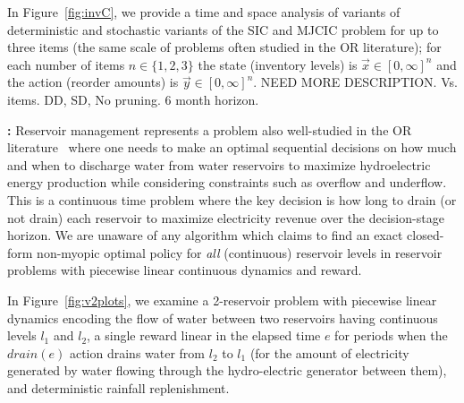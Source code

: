 In Figure~\ref{fig:invC}, we provide a time and space analysis
of variants of deterministic and stochastic variants of the
SIC and MJCIC problem for up to three items (the same scale of
problems often studied in the OR literature); for each number
of items $n \in \{ 1,2,3 \}$ the state (inventory levels) 
is $\vec{x} \in [0,\infty]^n$ and the 
action (reorder amounts) is $\vec{y} \in [0,\infty]^n$.
NEED MORE DESCRIPTION.  Vs. items.  DD, SD, No pruning.  6 month horizon.


{\bf \WaterReservoir:} Reservoir management represents a problem also
well-studied in the OR literature~\cite{Mahootchi2009,Yeh1985} where
one needs to make an optimal sequential decisions on how much and when
to discharge water from water reservoirs to maximize hydroelectric
energy production while considering constraints such as overflow
and underflow.  This is a continuous time problem where the key decision
is how long to drain (or not drain) each reservoir to maximize
electricity revenue over the decision-stage horizon.  
We are unaware of any algorithm which claims 
to find an exact closed-form non-myopic
optimal policy for \emph{all} (continuous) reservoir levels
in reservoir problems with piecewise linear continuous dynamics and reward.

In Figure~\ref{fig:v2plots}, we examine a 2-reservoir problem with
piecewise linear dynamics encoding the flow of water between two
reservoirs having continuous levels $l_1$ and $l_2$, a single reward
linear in the elapsed time $e$ for periods when the
$\mathit{drain}(e)$ action drains water from $l_2$ to $l_1$ (for the
amount of electricity generated by water flowing through the
hydro-electric generator between them), and deterministic 
rainfall replenishment.



